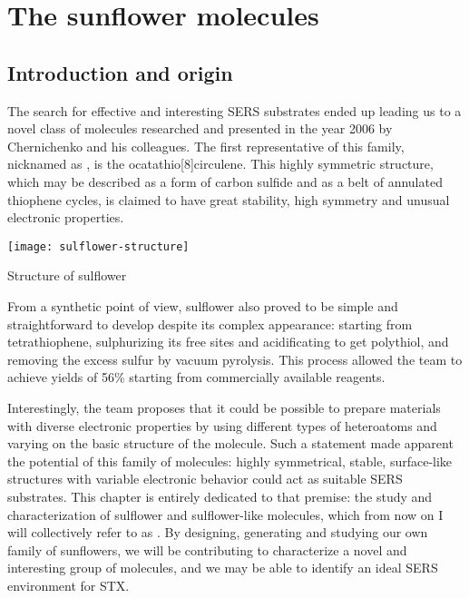 \chapter{The sunflower molecules}


\section{Introduction and origin}

The search for effective and interesting SERS substrates ended up leading us to a novel class of molecules researched and presented in the year 2006 by Chernichenko and his colleagues.
The first representative of this family, nicknamed as , is the ocatathio[8]circulene.
This highly symmetric structure, which may be described as a form of carbon sulfide and as a belt of annulated thiophene cycles, is claimed to have great stability, high symmetry and unusual electronic properties.

\begin{marginfigure}
    \texttt{[image: sulflower-structure]}
    \caption[Structure of sulflower]{Structure of sulflower}
\end{marginfigure}


From a synthetic point of view, sulflower also proved to be simple and straightforward to develop despite its complex appearance: starting from tetrathiophene, sulphurizing its free sites and acidificating to get polythiol, and removing the excess sulfur by vacuum pyrolysis.
This process allowed the team to achieve yields of 56\% starting from commercially available reagents.

Interestingly, the team proposes that it could be possible to prepare materials with diverse electronic properties by using different types of heteroatoms and varying on the basic structure of the molecule.
Such a statement made apparent the potential of this family of molecules: highly symmetrical, stable, surface-like structures with variable electronic behavior could act as suitable SERS substrates.
This chapter is entirely dedicated to that premise: the study and characterization of sulflower and sulflower-like molecules, which from now on I will collectively refer to as .
By designing, generating and studying our own family of sunflowers, we will be contributing to characterize a novel and interesting group of molecules, and we may be able to identify an ideal SERS environment for STX.


